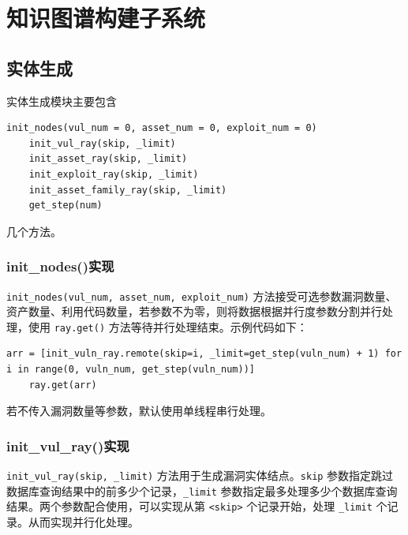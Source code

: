 \documentclass[a4paper,AutoFakeBold,oneside,12pt]{book}
\begin{document}
\section{知识图谱构建子系统}

\subsection{实体生成}

实体生成模块主要包含
\begin{lstlisting}[style = python]
	init_nodes(vul_num = 0, asset_num = 0, exploit_num = 0)
	init_vul_ray(skip, _limit)
	init_asset_ray(skip, _limit)
	init_exploit_ray(skip, _limit)
	init_asset_family_ray(skip, _limit)
	get_step(num)
\end{lstlisting}
几个方法。

\subsubsection{init{\_}nodes()实现}

\lstinline|init_nodes(vul_num, asset_num, exploit_num)| 方法接受可选参数漏洞数量、资产数量、利用代码数量，若参数不为零，则将数据根据并行度参数分割并行处理，使用 \lstinline|ray.get()| 方法等待并行处理结束。示例代码如下：
\begin{lstlisting}[style = python]
	arr = [init_vuln_ray.remote(skip=i, _limit=get_step(vuln_num) + 1) for i in range(0, vuln_num, get_step(vuln_num))]
	ray.get(arr)
\end{lstlisting}

若不传入漏洞数量等参数，默认使用单线程串行处理。

\subsubsection{init{\_}vul{\_}ray()实现\label{subsubsec:vul}}

\lstinline|init_vul_ray(skip, _limit)| 方法用于生成漏洞实体结点。\lstinline|skip| 参数指定跳过数据库查询结果中的前多少个记录，\lstinline|_limit| 参数指定最多处理多少个数据库查询结果。两个参数配合使用，可以实现从第 \lstinline|<skip>| 个记录开始，处理 \lstinline|_limit| 个记录。从而实现并行化处理。
\end{document}
